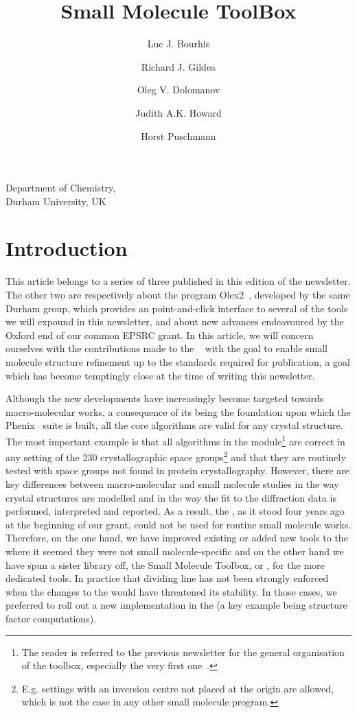 \documentclass[12pt]{article}
\title{Small Molecule ToolBox}
\author{Luc J. Bourhis \and Richard J. Gildea \and Oleg V. Dolomanov \and Judith A.K. Howard \and Horst Puschmann}
\date{}
\begin{document}
\maketitle
\begin{center}
Department of Chemistry, \\
Durham University, UK
\end{center}

\section{Introduction}

This article belongs to a series of three published in this edition of the newsletter. The other two are respectively about the program Olex2~\cite{Dolomanov:2009}, developed by the same Durham group, which provides an point-and-click interface to several of the tools we will expound in this newsletter, and about new advances endeavoured by the Oxford end of our common EPSRC grant. In this article, we will concern ourselves with the contributions made to the \cctbx~\cite{cctbx} with the goal to enable small molecule structure refinement up to the standards required for publication, a goal which has become temptingly close at the time of writing this newsletter.

Although the \cctbx new developments have increasingly become targeted towards macro-molecular works, a consequence of its being the foundation upon which the Phenix~\cite{phenix} suite is built, all the core algorithms are valid for any crystal structure. The most important example is that all algorithms in the \cctbx module\footnote{The reader is referred to the previous \cctbx newsletter for the general organisation of the toolbox, especially the very first one~\cite{Grosse-Kunstleve:2003}.} are correct in any setting of the 230 crystallographic space groups\footnote{E.g. settings with an inversion centre not placed at the origin are allowed, which is not the case in any other small molecule program.} and that they are routinely tested with space groups not found in protein crystallography. However, there are key differences between macro-molecular and small molecule studies in the way crystal structures are modelled and in the way the fit to the diffraction data is performed, interpreted and reported. As a result, the \cctbx, as it stood four years ago at the beginning of our grant, could not be used for routine small molecule works. Therefore, on the one hand, we have improved existing or added new tools to the \cctbx where it seemed they were not small molecule-specific and on the other hand we have spun a sister library off, the Small Molecule Toolbox, or \smtbx, for the more dedicated tools. In practice that dividing line has not been strongly enforced when the changes to the \cctbx would have threatened its stability. In those cases, we preferred to roll out a new implementation in the \smtbx (a key example being structure factor computations).
\end{document}
